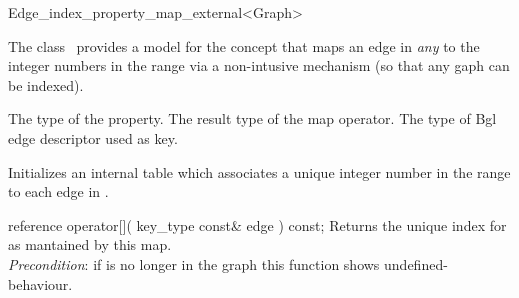 

\begin{ccRefClass}{Edge_index_property_map_external<Graph>}


\ccDefinition

The class \ccRefName\ provides a model for the concept 
that maps an edge in {\em any}
to the integer numbers in the range 
via a non-intusive mechanism (so that any gaph can be indexed).


\ccTypes
    {The type of the property.}
\ccGlue
    {The result type of the map operator.}
\ccGlue
\ccGlue
  {The type of {\sc Bgl} edge descriptor used as key.}

\ccCreation
{}  %

{Initializes an internal table which associates a unique integer
number in the range  to each edge in .}

\ccOperations

\ccMethod
  {reference operator[]( key_type const& edge ) const;}
  {Returns the unique index for  as mantained by this map.\\
  {\em Precondition}: if  is no longer in the graph this function shows undefined-behaviour.
  }
    
\ccIsModel
{} 

\ccSeeAlso
{}\\

\end{ccRefClass}


